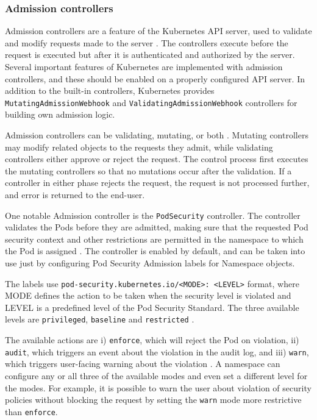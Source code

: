 \documentclass[english, 12pt, a4paper, sci, utf8, a-2b, online]{aaltothesis}
\begin{document}
\subsubsection{Admission controllers} \label{admission-controllers}

Admission controllers are a feature of the Kubernetes API server, used to validate and modify requests made to the server \cite{k8s-docs-admission}.
The controllers execute before the request is executed but after it is authenticated and authorized by the server.
Several important features of Kubernetes are implemented with admission controllers, and these should be enabled on a properly configured API server.
In addition to the built-in controllers, Kubernetes provides \texttt{MutatingAdmissionWebhook} and \texttt{ValidatingAdmissionWebhook} controllers for building own admission logic.

Admission controllers can be validating, mutating, or both \cite{k8s-docs-admission}.
Mutating controllers may modify related objects to the requests they admit, while validating controllers either approve or reject the request.
The control process first executes the mutating controllers so that no mutations occur after the validation.
If a controller in either phase rejects the request, the request is not processed further, and error is returned to the end-user.

One notable Admission controller is the \texttt{PodSecurity} controller.
The controller validates the Pods before they are admitted, making sure that the requested Pod security context and other restrictions are permitted in the namespace to which the Pod is assigned \cite{k8s-docs-admission}.
The controller is enabled by default, and can be taken into use just by configuring Pod Security Admission labels for Namespace objects.

The labels use \texttt{pod-security.kubernetes.io/<MODE>: <LEVEL>} format, where MODE defines the action to be taken when the security level is violated and LEVEL is a predefined level of the Pod Security Standard.
The three available levels are \texttt{privileged}, \texttt{baseline} and \texttt{restricted} \cite{k8s-docs-pss}.

The available actions are i) \texttt{enforce}, which will reject the Pod on violation, ii) \texttt{audit}, which triggers an event about the violation in the audit log, and iii) \texttt{warn}, which triggers user-facing warning about the violation \cite{k8s-docs-psa}.
A namespace can configure any or all three of the available modes and even set a different level for the modes.
For example, it is possible to warn the user about violation of security policies without blocking the request by setting the \texttt{warn} mode more restrictive than \texttt{enforce}.
\end{document}
